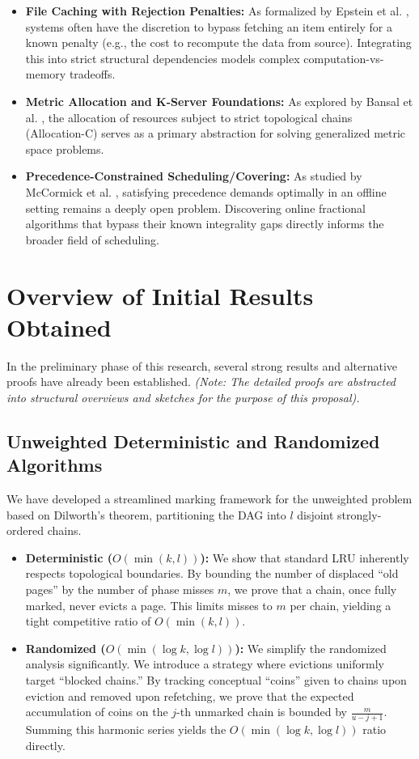 \documentclass[a4paper,11pt]{article}
\begin{document}
\begin{itemize}
    \item \textbf{File Caching with Rejection Penalties:} As formalized by Epstein et al. \cite{Epsteinetal2013}, systems often have the discretion to bypass fetching an item entirely for a known penalty (e.g., the cost to recompute the data from source). Integrating this into strict structural dependencies models complex computation-vs-memory tradeoffs.
    \item \textbf{Metric Allocation and K-Server Foundations:} As explored by Bansal et al. \cite{bansal2010towards, bansal2015polylogarithmic}, the allocation of resources subject to strict topological chains (Allocation-C) serves as a primary abstraction for solving generalized metric space problems.
    \item \textbf{Precedence-Constrained Scheduling/Covering:} As studied by McCormick et al. \cite{mccormick2017primal}, satisfying precedence demands optimally in an offline setting remains a deeply open problem. Discovering online fractional algorithms that bypass their known integrality gaps directly informs the broader field of scheduling.
\end{itemize}

\section{Overview of Initial Results Obtained}
In the preliminary phase of this research, several strong results and alternative proofs have already been established. \textit{(Note: The detailed proofs are abstracted into structural overviews and sketches for the purpose of this proposal).}

\subsection{Unweighted Deterministic and Randomized Algorithms}
We have developed a streamlined marking framework for the unweighted problem based on Dilworth's theorem, partitioning the DAG into $l$ disjoint strongly-ordered chains. 
\begin{itemize}
    \item \textbf{Deterministic ($O(\min(k,l))$):} We show that standard LRU inherently respects topological boundaries. By bounding the number of displaced ``old pages'' by the number of phase misses $m$, we prove that a chain, once fully marked, never evicts a page. This limits misses to $m$ per chain, yielding a tight competitive ratio of $O(\min(k,l))$.
    \item \textbf{Randomized ($O(\min(\log k, \log l))$):} We simplify the randomized analysis significantly. We introduce a strategy where evictions uniformly target ``blocked chains.'' By tracking conceptual ``coins'' given to chains upon eviction and removed upon refetching, we prove that the expected accumulation of coins on the $j$-th unmarked chain is bounded by $\frac{m}{u-j+1}$. Summing this harmonic series yields the $O(\min(\log k, \log l))$ ratio directly.
\end{itemize}
\end{document}
